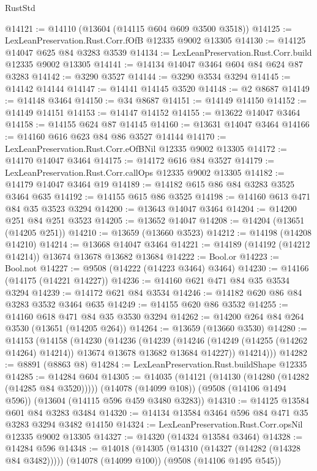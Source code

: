\begin{lexlean}{RustStd}
\begin{coremodule}
@14121 := @14110 (@13604 (@14115 @604 @609 @3500 @3518))
@14125 := LexLeanPreservation.Rust.Corr.fOfB @12335 @9002 @13305
@14130 := @14125 @14047 @625 @84 @3283 @3539
@14134 := LexLeanPreservation.Rust.Corr.build @12335 @9002 @13305
@14141 := @14134 @14047 @3464 @604 @84 @624 @87 @3283
@14142 := @3290 @3527
@14144 := @3290 @3534 @3294
@14145 := @14142 @14144
@14147 := @14141 @14145 @3520
@14148 := @2 @8687
@14149 := @14148 @3464
@14150 := @34 @8687
@14151 := @14149 @14150
@14152 := @14149 @14151
@14153 := @14147 @14152
@14155 := @13622 @14047 @3464
@14158 := @14155 @624 @87 @14145
@14160 := @13631 @14047 @3464
@14166 := @14160 @616 @623 @84 @86 @3527 @14144
@14170 := LexLeanPreservation.Rust.Corr.eOfBNil @12335 @9002 @13305
@14172 := @14170 @14047 @3464
@14175 := @14172 @616 @84 @3527
@14179 := LexLeanPreservation.Rust.Corr.callOps @12335 @9002 @13305
@14182 := @14179 @14047 @3464 @19
@14189 := @14182 @615 @86 @84 @3283 @3525 @3464 @635
@14192 := @14155 @615 @86 @3525
@14198 := @14160 @613 @471 @84 @35 @3523 @3294
@14200 := @13643 @14047 @3464
@14204 := @14200 @251 @84 @251 @3523
@14205 := @13652 @14047
@14208 := @14204 (@13651 (@14205 @251))
@14210 := @13659 (@13660 @3523)
@14212 := @14198 (@14208 @14210)
@14214 := @13668 @14047 @3464
@14221 := @14189 (@14192 (@14212 @14214)) @13674 @13678 @13682 @13684
@14222 := Bool.or
@14223 := Bool.not
@14227 := @9508 (@14222 (@14223 @3464) @3464)
@14230 := @14166 (@14175 (@14221 @14227))
@14236 := @14160 @621 @471 @84 @35 @3534 @3294
@14239 := @14172 @621 @84 @3534
@14246 := @14182 @620 @86 @84 @3283 @3532 @3464 @635
@14249 := @14155 @620 @86 @3532
@14255 := @14160 @618 @471 @84 @35 @3530 @3294
@14262 := @14200 @264 @84 @264 @3530 (@13651 (@14205 @264))
@14264 := @13659 (@13660 @3530)
@14280 := @14153
    (@14158
      (@14230
        (@14236
          (@14239
            (@14246 (@14249 (@14255 (@14262 @14264) @14214)) @13674 @13678 @13682 @13684 @14227))
          @14214)))
@14282 := @8891 (@8863 @8)
@14284 := LexLeanPreservation.Rust.buildShape @12335
@14285 := @14284 @604
@14305 := @14035
    (@14121 (@14130 (@14280 (@14282 (@14285 @84 @3520)))))
    (@14078 (@14099 @108))
    (@9508 (@14106 @1494 @596))
    (@13604 (@14115 @596 @459 @3480 @3283))
@14310 := @14125 @13584 @601 @84 @3283 @3484
@14320 := @14134 @13584 @3464 @596 @84 @471 @35 @3283 @3294 @3482 @14150
@14324 := LexLeanPreservation.Rust.Corr.opsNil @12335 @9002 @13305
@14327 := @14320 (@14324 @13584 @3464)
@14328 := @14284 @596
@14348 := @14018
    (@14305 (@14310 (@14327 (@14282 (@14328 @84 @3482)))))
    (@14078 (@14099 @100))
    (@9508 (@14106 @1495 @545))

\end{coremodule}
\end{lexlean}
